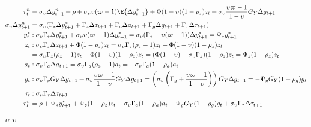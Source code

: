 \begin{align}
    r^n_t  &= \sigma_\upsilon \Delta y^n_{t+1} + \rho + \sigma_\upsilon \upsilon (\varpi - 1)\E \{\Delta y_{t+1}^* \}  + \Phi (1-\upsilon)(1-\rho_z)z_t + \sigma_\upsilon \frac{\upsilon \varpi  - 1}{1-\upsilon} G_Y \Delta g_{t+1}\\
    \sigma_\upsilon \Delta y^n_{t+1} &= \sigma_\upsilon(\Gamma_* \Delta y^*_{t+1} + \Gamma_z \Delta z_{t+1} + \Gamma_a \Delta a_{t+1} + \Gamma_g \Delta g_{t+1} + \Gamma_\tau \Delta \tau_{t+1})\\
    y^*_t&: \sigma_\upsilon \Gamma_* \Delta y^*_{t+1} + \sigma_\upsilon \upsilon(\varpi-1)\Delta y^*_{t+1} = \sigma_\upsilon(\Gamma_* + \upsilon(\varpi-1))\Delta y^*_{t+1} = \Psi_* y^*_{t+1}\\
    z_t&: \sigma_\upsilon \Gamma_z \Delta z_{t+1} + \Phi (1-\rho_z)z_t = \sigma_\upsilon \Gamma_z (\rho_z - 1)z_t + \Phi (1-\upsilon)(1-\rho_z)z_t\\
    &= \sigma_\upsilon \Gamma_z (\rho_z - 1)z_t + \Phi (1-\upsilon)(1-\rho_z)z_t = (\Phi (1-\upsilon) - \sigma_\upsilon \Gamma_z)(1-\rho_z)z_t = \Psi_z (1-\rho_z) z_t\\
    a_t&: \sigma_\upsilon \Gamma_a \Delta a_{t+1} = \sigma_\upsilon \Gamma_a (\rho_a - 1)a_t = - \sigma_\upsilon \Gamma_a (1 - \rho_a)a_t\\
    g_t&: \sigma_\upsilon \Gamma_g G_Y \Delta g_{t+1} + \sigma_\upsilon \frac{\upsilon \varpi  - 1}{1-\upsilon} G_Y \Delta g_{t+1} = \left( \sigma_\upsilon \left(\Gamma_g + \frac{\upsilon \varpi  - 1}{1-\upsilon} \right) \right)G_Y \Delta g_{t+1} = -\Psi_g G_Y (1-\rho_g)g_t \\
    \tau_t&: \sigma_\upsilon \Gamma_\tau \Delta \tau_{t+1}\\
    r^n_t  &= \rho + \Psi_* y^*_{t+1} + \Psi_z (1-\rho_z) z_t - \sigma_\upsilon \Gamma_a (1 - \rho_a)a_t -\Psi_g G_Y (1-\rho_g)g_t + \sigma_\upsilon \Gamma_\tau \Delta \tau_{t+1}
\end{align}
$\upsilon$ $v$